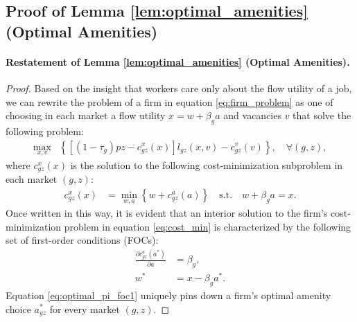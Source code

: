 \subsection{Proof of Lemma \ref{lem:optimal_amenities} (Optimal Amenities)\label{app:proof_lemma_optimal_amenities}}

\paragraph{Restatement of Lemma \ref{lem:optimal_amenities} (Optimal Amenities).}

\emph{%
    \LemmaOptimalAmenities%
}

\begin{proof}
    Based on the insight that workers care only about the flow utility of a job, we can rewrite the problem of a firm in equation \eqref{eq:firm_problem} as one of choosing in each market a flow utility $x = w + \beta_{g} a$ and vacancies $v$ that solve the following problem:
    \begin{align}
        \max_{x,v} & \left\{ \left[ (1-\tau_g) pz - c_{gz}^{x}(x) \right] l_{gz}(x,v) - c_{gz}^{v}(v) \right\}, \quad \forall (g, z),
    \end{align}
    where $c_{gz}^{x}(x)$ is the solution to the following cost-minimization subproblem in each market $(g, z)$:
    \begin{align}
        c_{gz}^{x}(x) &= \min_{w, a} \left\{ w + c_{gz}^{a}(a) \right\} \quad \text{s.t.} \quad w + \beta_{g} a = x. \label{eq:cost_min}
    \end{align}
    Once written in this way, it is evident that an interior solution to the firm's cost-minimization problem in equation \eqref{eq:cost_min} is characterized by the following set of first-order conditions (FOCs):
    \begin{align}
        \frac{\partial {c}_{gz}^{a}(a^{*})}{\partial a} &= \beta_{g}, \label{eq:optimal_pi_foc1} \\
        w^{*} &= x - \beta_{g} a^{*}. \label{eq:optimal_w_foc2}
    \end{align}
    Equation \eqref{eq:optimal_pi_foc1} uniquely pins down a firm's optimal amenity choice $a_{gz}^{*}$ for every market $(g, z)$.


\end{proof}
